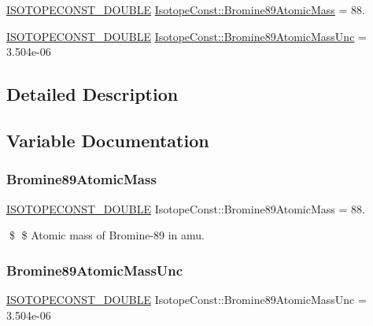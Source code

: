 \begin{DoxyCompactItemize}
\item 
\mbox{\hyperlink{group___isotope_const-_macros_ga8f45a7272ce02c0b4c65c44636ed719a}{I\+S\+O\+T\+O\+P\+E\+C\+O\+N\+S\+T\+\_\+\+D\+O\+U\+B\+LE}} \mbox{\hyperlink{group___isotope_const-_bromine-_br89_gaf327691f5f0ca5c9df2c3d29926e4f9d}{Isotope\+Const\+::\+Bromine89\+Atomic\+Mass}} = 88.
\item 
\mbox{\hyperlink{group___isotope_const-_macros_ga8f45a7272ce02c0b4c65c44636ed719a}{I\+S\+O\+T\+O\+P\+E\+C\+O\+N\+S\+T\+\_\+\+D\+O\+U\+B\+LE}} \mbox{\hyperlink{group___isotope_const-_bromine-_br89_ga6fd79f0298185a45503e4873ddf81c5a}{Isotope\+Const\+::\+Bromine89\+Atomic\+Mass\+Unc}} = 3.\+504e-\/06
\end{DoxyCompactItemize}


\subsection{Detailed Description}


\subsection{Variable Documentation}
\mbox{\label{group___isotope_const-_bromine-_br89_gaf327691f5f0ca5c9df2c3d29926e4f9d}} 
\subsubsection{\texorpdfstring{Bromine89\+Atomic\+Mass}{Bromine89AtomicMass}}
{\footnotesize\ttfamily \mbox{\hyperlink{group___isotope_const-_macros_ga8f45a7272ce02c0b4c65c44636ed719a}{I\+S\+O\+T\+O\+P\+E\+C\+O\+N\+S\+T\+\_\+\+D\+O\+U\+B\+LE}} Isotope\+Const\+::\+Bromine89\+Atomic\+Mass = 88.}

\$ \$ Atomic mass of Bromine-\/89 in amu. \mbox{\label{group___isotope_const-_bromine-_br89_ga6fd79f0298185a45503e4873ddf81c5a}} 
\subsubsection{\texorpdfstring{Bromine89\+Atomic\+Mass\+Unc}{Bromine89AtomicMassUnc}}
{\footnotesize\ttfamily \mbox{\hyperlink{group___isotope_const-_macros_ga8f45a7272ce02c0b4c65c44636ed719a}{I\+S\+O\+T\+O\+P\+E\+C\+O\+N\+S\+T\+\_\+\+D\+O\+U\+B\+LE}} Isotope\+Const\+::\+Bromine89\+Atomic\+Mass\+Unc = 3.\+504e-\/06}

